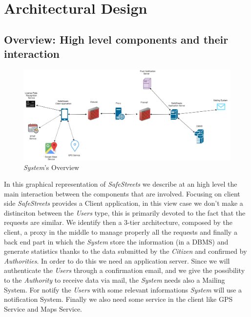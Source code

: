 \documentclass{article}
\begin{document}
\clearpage

\section{Architectural Design}

\subsection{Overview: High level components and their interaction}

\begin{figure}[H]
    \centering
    \includegraphics[scale=0.5]{img/Overview.png}
    \caption{\textit{System}'s Overview}
\end{figure}

In this graphical representation of \textit{SafeStreets} we describe at an high level the main interaction
between the components that are involved. Focusing on client side \textit{SafeStreets} provides a Client 
application, in this view case we don't make a distinciton between the \textit{Users} type, this is 
primarily devoted to the fact that the requests are similar. We identify then a 3-tier architecture, 
composed by the client, a proxy in the middle to manage properly all the requests and finally a back 
end part in which the \textit{System} store the information (in a DBMS) and generate statistics thanks
to the data submitted by the \textit{Citizen} and confirmed by \textit{Authorities}. In order to do this
we need an application server. Since we will authenticate the \textit{Users} through a confirmation email, 
and we give the possibility to the \textit{Authority} to receive data via mail, the \textit{System} needs
also a Mailing System. For notify the \textit{Users} with some relevant informations \textit{System} will 
use a notification System. Finally we also need some service in the client like GPS Service and Maps Service.
\end{document}
